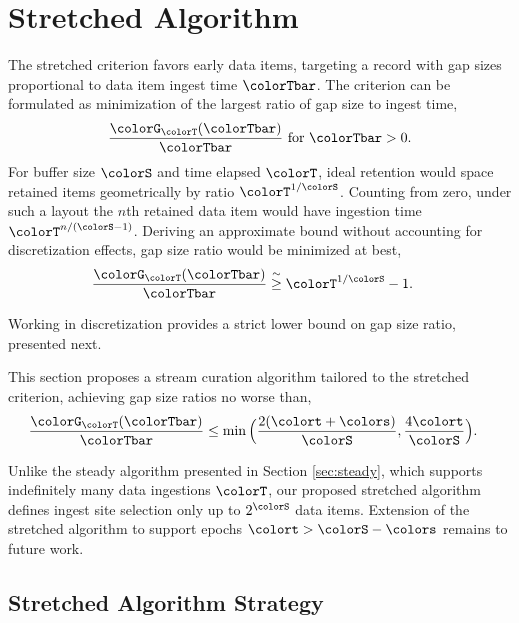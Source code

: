 \section{Stretched Algorithm} \label{sec:stretched}

The stretched criterion favors early data items, targeting a record with gap sizes proportional to data item ingest time $\colorTbar$.
The criterion can be formulated as minimization of the largest ratio of gap size to ingest time,
\begin{align*}
\frac{\colorG_{\colorT}(\colorTbar)}{\colorTbar} \text{ for } \colorTbar > 0.
\end{align*}
For buffer size $\colorS$ and time elapsed $\colorT$, ideal retention would space retained items geometrically by ratio $\colorT^{1/\colorS}$.
Counting from zero, under such a layout the $n$th retained data item would have ingestion time $\colorT^{n/(\colorS - 1)}$.
Deriving an approximate bound without accounting for discretization effects, gap size ratio would be minimized at best,
\begin{align*}
\frac{\colorG_{\colorT}(\colorTbar)}{\colorTbar}
&\stackrel{\sim}{\geq}
\colorT^{1/\colorS} - 1.
\end{align*}

Working in discretization provides a strict lower bound on gap size ratio, presented next.



This section proposes a stream curation algorithm tailored to the stretched criterion, achieving gap size ratios no worse than,
\begin{align*}
\frac{\colorG_{\colorT}(\colorTbar)}{\colorTbar}
&\leq
\min\Big(
  \frac{2(\colort + \colors)}{\colorS},
  \frac{4\colort}{\colorS}
\Big).
\end{align*}

Unlike the steady algorithm presented in Section \ref{sec:steady}, which supports indefinitely many data ingestions $\colorT$, our proposed stretched algorithm defines ingest site selection only up to $2^{\colorS}$ data items.
Extension of the stretched algorithm to support epochs $\colort > \colorS - \colors$ remains to future work.

\subsection{Stretched Algorithm Strategy}
\label{sec:stretched-strategy}



